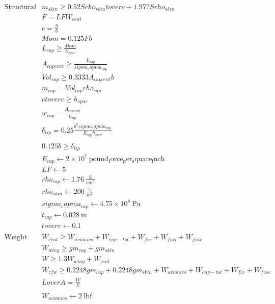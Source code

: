 \documentclass[10pt, a4paper]{article}
\begin{document}
\[ \begin{array}{ll} 
\text{Structural Model}
    & {m_{skin}} \geq 0.52{S} {rho_{skin}} {toverc} + 1.977{S} {rho_{skin}} \\
    & {F} = {LF} {W_{cent}} \\
    & {c} = \frac{{S}}{{b}} \\
    & {Mom} = 0.125{F} {b} \\
    & {L_{cap}} \geq \frac{{Mom}}{{h_{spar}}} \\
    & {A_{capcent}} \geq \frac{{L_{cap}}}{{sigma_capma_{cap}}} \\
    & {Vol_{cap}} \geq 0.3333{A_{capcent}} {b} \\
    & {m_{cap}} = {Vol_{cap}} {rho_{cap}} \\
    & {c} {toverc} \geq {h_{spar}} \\
    & {w_{cap}} = \frac{{A_{capcent}}}{{t_{cap}}} \\
    & {\delta_{tip}} = 0.25\frac{{b}^{2} {sigma_capma_{cap}}}{{E_{cap}} {h_{spar}}} \\
    \text{} \\
    & 0.125{b} \geq {\delta_{tip}} \\
    & {E_{cap}} \gets 2 \times 10^{7}~\mathrm{pound_force_per_square_inch} \\
    & {LF} \gets 5 \\
    & {rho_{cap}} \gets 1.76~\mathrm{\tfrac{g}{cm^{3}}} \\
    & {rho_{skin}} \gets 200~\mathrm{\tfrac{g}{m^{2}}} \\
    & {sigma_capma_{cap}} \gets 4.75 \times 10^{8}~\mathrm{Pa} \\
    & {t_{cap}} \gets 0.028~\mathrm{in} \\
    & {toverc} \gets 0.1 \\
\text{} \\
\text{Weight Model}
    & {W_{cent}} \geq {W_{avionics}} + {W_{eng-tot}} + {W_{fix}} + {W_{fuel}} + {W_{fuse}} \\
    & {W_{wing}} \geq {g} {m_{cap}} + {g} {m_{skin}} \\
    & {W} \geq 1.3{W_{wing}} + {W_{cent}} \\
    & {W_{zfw}} \geq 0.2248{g} {m_{cap}} + 0.2248{g} {m_{skin}} + {W_{avionics}} + {W_{eng-tot}} + {W_{fix}} + {W_{fuse}} \\
    & {LoverA} = \frac{{W}}{{S}} \\
    \text{} \\
    & {W_{avionics}} \gets 2~\mathrm{lbf} \\

\end{array}\]
\end{document}
